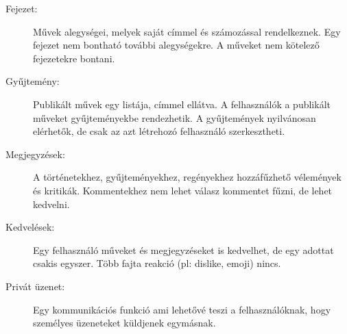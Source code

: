 \begin{description}
\item [Fejezet:]  Művek alegységei, melyek saját címmel és számozással rendelkeznek. Egy fejezet nem bontható további alegységekre. A műveket nem kötelező fejezetekre bontani. 

\item [Gyűjtemény:] Publikált művek egy listája, címmel ellátva. A felhasználók a publikált műveket gyűjteményekbe rendezhetik. A gyűjtemények nyilvánosan elérhetők, de csak az azt létrehozó felhasználó szerkesztheti.

\item [Megjegyzések:] A történetekhez, gyűjteményekhez, regényekhez hozzáfűzhető vélemények és kritikák. Kommentekhez nem lehet válasz kommentet fűzni, de lehet kedvelni.

\item [Kedvelések:] Egy felhasználó műveket és megjegyzéseket is kedvelhet, de egy adottat csakis egyszer. Több fajta reakció (pl: dislike, emoji) nincs.

\item [Privát üzenet:] Egy kommunikációs funkció ami lehetővé teszi a felhasználóknak, hogy személyes üzeneteket küldjenek egymásnak.
\end{description}